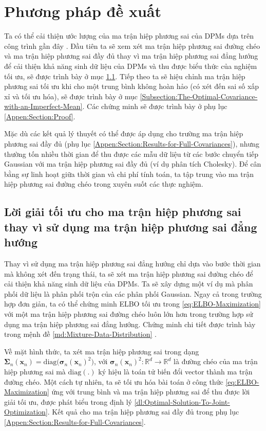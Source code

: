 \documentclass[14pt, a4paper]{article}
\numberwithin{equation}{section}
\numberwithin{figure}{section}
\numberwithin{dl}{section}
\numberwithin{md}{section}
\numberwithin{bd}{section}
\numberwithin{dn}{section}
\numberwithin{hq}{section}
\begin{document}
    \section{Phương pháp đề xuất}

    Ta có thể cải thiện ước lượng của ma trận hiệp phương sai của DPMs dựa trên công trình gần đây \cite{bao2021analytic}.
    Đầu tiên ta sẽ xem xét ma trận hiệp phương sai đường chéo và ma trận hiệp phương sai đầy đủ thay vì ma trận hiệp phương sai đẳng hướng để cải thiện khả năng sinh dữ liệu của DPMs và thu được biểu thức của nghiệm tối ưu,
    sẽ được trình bày ở mục \ref{Optimal-Solution-Covariance-Beyond-Isotropic-Covariance}. Tiếp theo ta sẽ hiệu chỉnh ma trận hiệp phương sai tối ưu khi cho một trung bình không hoàn hảo (có xét đến sai số xấp xỉ và tối ưu hóa), sẽ được trình bày ở mục \ref{Subsection:The-Optimal-Covariance-with-an-Imperfect-Mean}.
    Các chứng minh sẽ được trình bày ở phụ lục \ref{Appen:Section:Proof}.

    Mặc dù các kết quả lý thuyết có thể được áp dụng cho trường ma trận hiệp phương sai đầy đủ (phụ lục \ref{Appen:Section:Results-for-Full-Covariances}), 
    nhưng thường tốn nhiều thời gian để thu được các mẫu dữ liệu từ các bước chuyển tiếp Gaussian với ma trận hiệp phương sai đầy đủ (ví dụ phân tích Cholesky).
    Để cân bằng sự linh hoạt giữa thời gian và chi phí tính toán, ta tập trung vào ma trận hiệp phương sai đường chéo trong xuyên suốt các thực nghiệm.

    \subsection{Lời giải tối ưu cho ma trận hiệp phương sai thay vì sử dụng ma trận hiệp phương sai đẳng hướng} \label{Optimal-Solution-Covariance-Beyond-Isotropic-Covariance}

    Thay vì sử dụng ma trận hiệp phương sai đẳng hướng chỉ dựa vào bước thời gian mà không xét đến trạng thái, ta sẽ xét ma trận hiệp phương sai đường chéo để cải thiện khả năng sinh dữ liệu của DPMs.
    Ta sẽ xây dựng một ví dụ mà phân phối dữ liệu là phân phối trộn của các phân phối Gaussian.
    Ngay cả trong trường hợp đơn giản, ta có thể chứng minh ELBO tối ưu trong \ref{eq:ELBO-Maximization} với một ma trận hiệp phương sai đường chéo luôn lớn hơn trong trường hợp sử dụng ma trận hiệp phương sai đẳng hướng.
    Chứng minh chi tiết được trình bày trong mệnh đề \ref{md:Mixture-Data-Distribution} .

    Về mặt hình thức, ta xét ma trận hiệp phương sai trong dạng $\boldsymbol{\Sigma}_n (\boldsymbol{x}_n)=\mathrm{diag}\big( \boldsymbol{\sigma}_n (\boldsymbol{x}_n)^2 \big)$,
    với $\boldsymbol{\sigma}_n (\boldsymbol{x}_n)^2: \mathbb{R}^d \rightarrow \mathbb{R}^d$ là đường chéo của ma trận hiệp phương sai mà $\mathrm{diag} (.)$ ký hiệu là toán tử biến đổi vector thành ma trận đường chéo.
    Một cách tự nhiên, ta sẽ tối ưu hóa bài toán ở công thức \ref{eq:ELBO-Maximization} ứng với trung bình và ma trận hiệp phương sai để thu được lời giải tối ưu,
    được phát biểu trong định lý \ref{dl:Optimal-Solution-To-Joint-Optimization}. Kết quả cho ma trận hiệp phương sai đầy đủ trong phụ lục \ref{Appen:Section:Results-for-Full-Covariances}.
\end{document}
